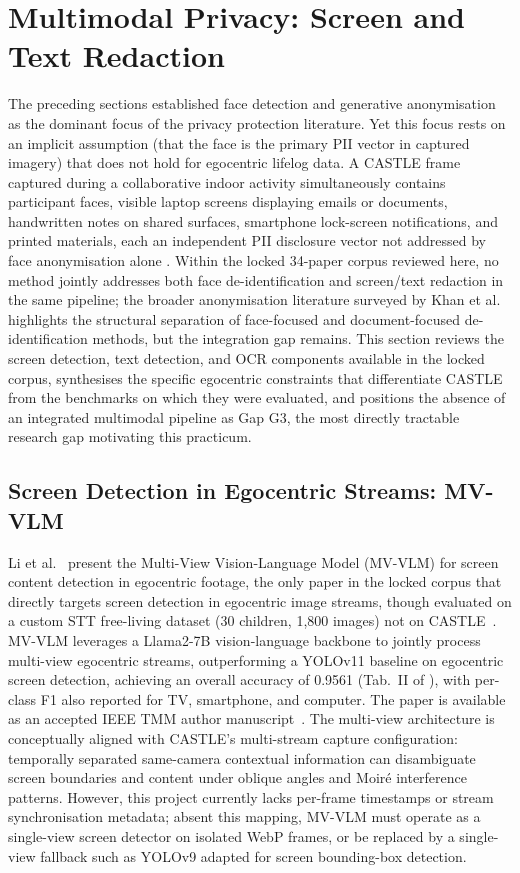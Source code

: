 \documentclass[12pt, onecolumn]{IEEEtran}
\begin{document}
\section{Multimodal Privacy: Screen and Text Redaction}
\label{sec:multimodal}

The preceding sections established face detection and generative
anonymisation as the dominant focus of the privacy protection
literature. Yet this focus rests on an implicit assumption (that the
face is the primary PII vector in captured imagery) that does not hold
for egocentric lifelog data. A CASTLE frame captured during a
collaborative indoor activity simultaneously contains participant
faces, visible laptop screens displaying emails or documents,
handwritten notes on shared surfaces, smartphone lock-screen
notifications, and printed materials, each an independent PII
disclosure vector not addressed by face anonymisation alone
\cite{rossetto2025castle}. Within the locked 34-paper corpus reviewed
here, no method jointly addresses both face de-identification and
screen/text redaction in the same pipeline; the broader anonymisation
literature surveyed by Khan et al.\ \cite{khan2024survey} highlights
the structural separation of face-focused and document-focused
de-identification methods, but the integration gap remains. This
section reviews the screen detection, text detection, and OCR
components available in the locked corpus, synthesises
the specific egocentric constraints that differentiate CASTLE from the
benchmarks on which they were evaluated, and positions the absence of
an integrated multimodal pipeline as Gap G3, the most directly
tractable research gap motivating this practicum.

\subsection{Screen Detection in Egocentric Streams: MV-VLM}

Li et al.\ \cite{li2026screen} present the Multi-View Vision-Language
Model (MV-VLM) for screen content detection in egocentric footage, the only paper in the locked corpus that directly targets screen detection in egocentric image streams, though evaluated on a custom STT free-living dataset (30 children, 1{,}800 images) not on CASTLE~\cite{li2026screen}.
MV-VLM leverages a Llama2-7B vision-language backbone to jointly
process multi-view egocentric streams, outperforming a YOLOv11 baseline
on egocentric screen detection, achieving an overall accuracy of 0.9561
(Tab.~II of \cite{li2026screen}), with per-class F1 also reported for
TV, smartphone, and computer. The paper is available as an accepted
IEEE TMM author manuscript~\cite{li2026screen}. The multi-view architecture is
conceptually aligned with CASTLE's multi-stream capture configuration:
temporally separated same-camera contextual information can disambiguate screen boundaries
and content under oblique angles and Moir{\'e} interference patterns.
However, this project currently lacks per-frame timestamps or stream
synchronisation metadata; absent this mapping, MV-VLM must operate as a
single-view screen detector on isolated WebP frames, or be replaced by
a single-view fallback such as YOLOv9 adapted for screen bounding-box
detection.
\end{document}
